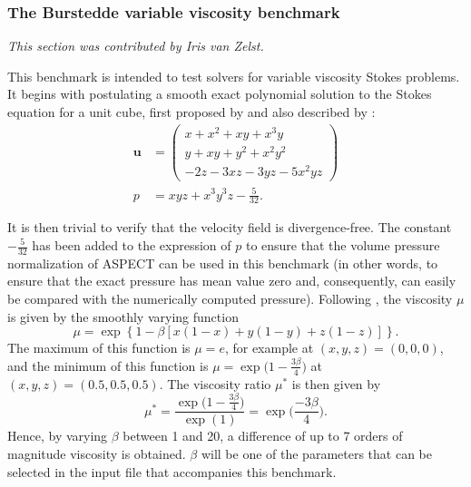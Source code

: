 \documentclass{article}
\newcommand{\aspect}{\textsc{ASPECT}}
\begin{document}




\subsubsection{The Burstedde variable viscosity benchmark}
\label{sec:benchmark-burstedde}

\textit{This section was contributed by Iris van Zelst.}

This benchmark is intended to test solvers for variable viscosity Stokes
problems. It begins with postulating a smooth exact polynomial solution to the Stokes equation for a unit cube, first proposed by \cite{dobo04} and also described by \cite{busa13}:
\begin{align}
  {\mathbf u} &= \left( \begin{array}{c}
      x+x^2+xy+x^3y \\
      y + xy + y^2 + x^2 y^2\\
      -2z - 3xz - 3yz - 5x^2 yz
    \end{array}
  \right)
  \label{eq:burstedde-velocity}
  \\
  p &= xyz + x^3 y^3z - \frac{5}{32}.
  \label{eq:burstedde-pressure}
\end{align}

It is then trivial to verify that the velocity field is divergence-free. The
constant $-\frac{5}{32}$ has been added to the expression of $p$ to ensure
that the volume pressure normalization of \aspect{} can be used in this
benchmark (in other words, to ensure that the exact pressure has mean value
zero and, consequently, can easily be compared with the numerically computed
pressure). Following \cite{busa13}, the viscosity $\mu$ is given by the smoothly varying function
\begin{equation}
  \mu = \exp\left\{1 - \beta\left[x (1-x) + y(1-y) + z(1-z)\right]\right\}.
  \label{eq:burstedde-mu}
\end{equation}
The maximum of this function is $\mu = e$, for example at $(x,y,z)=(0,0,0)$, and the minimum of this function is $\mu = \exp \Big( 1-\frac{3\beta}{4}\Big)$ at $(x,y,z) = (0.5,0.5,0.5)$. The viscosity ratio $\mu^\ast$ is then given by
\begin{equation}
  \mu^\ast = \frac{\exp\Big(1-\frac{3\beta}{4}\Big)}{\exp(1)} = \exp\Big(\frac{-3\beta}{4}\Big).
\end{equation}
Hence, by varying $\beta$ between 1 and 20, a difference of up to 7 orders of
magnitude viscosity is obtained. $\beta$ will be one of the parameters that
can be selected in the input file that accompanies this benchmark.
\end{document}
